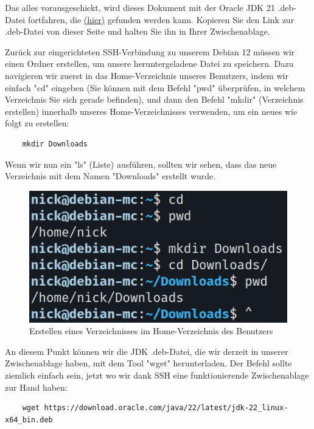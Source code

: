 \documentclass[]{article}
\begin{document}
Das alles vorausgeschickt, wird dieses Dokument mit der Oracle JDK 21 .deb-Datei fortfahren, die \href{https://www.oracle.com/java/technologies/downloads/}{(hier)} gefunden werden kann. Kopieren Sie den Link zur .deb-Datei von dieser Seite und halten Sie ihn in Ihrer Zwischenablage.

Zurück zur eingerichteten SSH-Verbindung zu unserem Debian 12 müssen wir einen Ordner erstellen, um unsere heruntergeladene Datei zu speichern. Dazu navigieren wir zuerst in das Home-Verzeichnis unseres Benutzers, indem wir einfach "cd" eingeben (Sie können mit dem Befehl "pwd" überprüfen, in welchem Verzeichnis Sie sich gerade befinden), und dann den Befehl "mkdir" (Verzeichnis erstellen) innerhalb unseres Home-Verzeichnisses verwenden, um ein neues wie folgt zu erstellen:

\begin{verbatim}
	mkdir Downloads
\end{verbatim}

Wenn wir nun ein "ls" (Liste) ausführen, sollten wir sehen, dass das neue Verzeichnis mit dem Namen "Downloads" erstellt wurde.

\begin{figure}[h!]
	\caption{Erstellen eines Verzeichnisses im Home-Verzeichnis des Benutzers}
	\centering
	\includegraphics[width=1\textwidth]{downloads}
\end{figure}
\FloatBarrier

An diesem Punkt können wir die JDK .deb-Datei, die wir derzeit in unserer Zwischenablage haben, mit dem Tool "wget" herunterladen. Der Befehl sollte ziemlich einfach sein, jetzt wo wir dank SSH eine funktionierende Zwischenablage zur Hand haben:

\begin{verbatim}
	wget https://download.oracle.com/java/22/latest/jdk-22_linux-x64_bin.deb
\end{verbatim}
\end{document}
